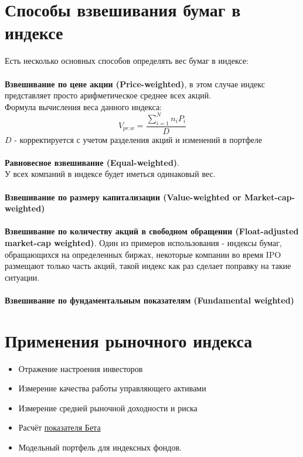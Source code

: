 \documentclass{article}
\begin{document}
\section{Способы взвешивания бумаг в индексе}
Есть несколько основных способов определять вес бумаг в индексе: \\\\
\textbf{Взвешивание по цене акции (Price-weighted)}, в этом случае индекс представляет просто арифметическое среднее всех акций. \\
Формула  вычисления веса данного индекса:
$$ V_{pr.w} = \frac{\sum_{ i=1}^{N} n_iP_i}{D}$$
$D$ - корректируется с учетом разделения акций и изменений в портфеле \\\\
\textbf{Равновесное взвешивание (Equal-weighted)}.\\
У всех компаний в индексе будет иметься одинаковый вес.\\\\
\textbf{Взвешивание по размеру капитализации (Value-weighted or Market-cap-weighted)}\\\\
\textbf{Взвешивание по количеству акций в свободном обращении (Float-adjusted market-cap weighted)}. Один из примеров использования - индексы бумаг, обращающихся на определенных биржах, некоторые компании во время IPO размещают только часть акций, такой индекс как раз сделает поправку на такие ситуации.\\\\
\textbf{Взвешивание по фундаментальным показателям (Fundamental weighted)}



\section{Применения рыночного индекса}
\begin{itemize}
  \item Отражение настроения инвесторов
  \item Измерение качества работы управляющего активами
  \item Измерение средней рыночной доходности и риска
  \item Расчёт \href{https://en.wikipedia.org/wiki/Beta_(finance)}{показателя Бета}   
  \item Модельный портфель для индексных фондов.
\end{itemize}
\end{document}
